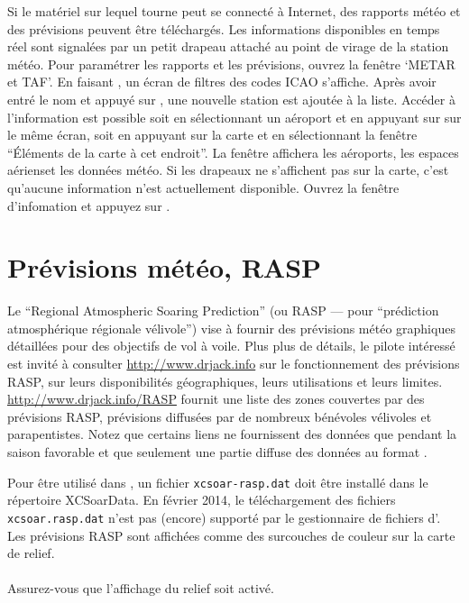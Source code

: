 Si le matériel sur lequel tourne \xc{} peut se connecté à Internet, des rapports météo et des prévisions peuvent être téléchargés.
Les informations disponibles en temps réel sont signalées par un petit drapeau attaché au point de virage de la station météo.
Pour paramétrer les rapports et les prévisions, ouvrez la fenêtre `METAR et TAF'.
En faisant , un écran de filtres des codes ICAO s'affiche.
Après avoir entré le nom et appuyé sur , une nouvelle station est ajoutée à la liste.
Accéder à l'information est possible soit en sélectionnant un aéroport et en appuyant sur  sur le même écran, soit en appuyant sur la carte et en sélectionnant la fenêtre ``Éléments de la carte à cet endroit''.
La fenêtre affichera les aéroports, les espaces aériens\textellipsis et les données météo.
Si les drapeaux ne s'affichent pas sur la carte, c'est qu'aucune information n'est actuellement disponible.
Ouvrez la fenêtre d'infomation et appuyez sur .

\section{Prévisions météo, RASP}\label{sec:weather-forecast}

Le ``Regional Atmospheric Soaring Prediction'' (ou RASP --- pour ``prédiction atmosphérique régionale vélivole'') vise à fournir des prévisions météo graphiques détaillées pour des objectifs de vol à voile.
Plus plus de détails, le pilote intéressé est invité à consulter \url{http://www.drjack.info} sur le fonctionnement des prévisions RASP, sur leurs disponibilités géographiques, leurs utilisations et leurs limites.
\url{http://www.drjack.info/RASP} fournit une liste des zones couvertes par des prévisions RASP, prévisions diffusées par de nombreux bénévoles vélivoles et parapentistes.
Notez que certains liens ne fournissent des données que pendant la saison favorable et que seulement une partie diffuse des données au format \xc{}.

Pour être utilisé dans \xc, un fichier \verb|xcsoar-rasp.dat| doit être installé dans le répertoire XCSoarData.
En février 2014, le téléchargement des fichiers \verb|xcsoar.rasp.dat| n'est pas (encore) supporté par le gestionnaire de fichiers d'\xc.
Les prévisions RASP sont affichées comme des surcouches de couleur sur la carte de relief.\\ \\
Assurez-vous que l'affichage du relief soit activé. \tip{} \\ \\


